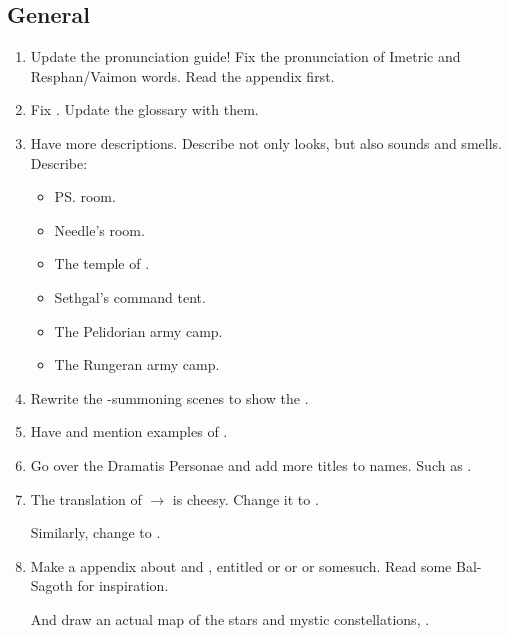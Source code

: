 \subsection{General}
\begin{enumerate}
  \item 
    Update the pronunciation guide!
    Fix the pronunciation of Imetric and Resphan/Vaimon words. 
    Read the  appendix first. 
    
  \item 
    Fix . 
    Update the glossary with them. 

  \item 
    Have more descriptions. 
    Describe not only looks, but also sounds and smells. 
    Describe: 
    \begin{itemize}
      \item \ps{\Tiroco} room. 
      \item Needle's room. 
      \item The temple of \EreshKal. 
      \item Sethgal's command tent. 
      \item The Pelidorian army camp. 
      \item The Rungeran army camp. 
    \end{itemize}
  
  \item 
    Rewrite the \Archon-summoning scenes to show the . 
  
  \item 
    Have and mention examples of . 
  
  \item 
    Go over the Dramatis Personae and add more titles to names. 
    Such as . 
  
  \item 
    The translation of  $\to$  is cheesy. 
    Change it to . 
    
    Similarly, change \itzach to .
  
  \item 
    Make a appendix about \matrices{} and , entitled  or  or  or somesuch. 
    Read some Bal-Sagoth for inspiration. 
    
    And draw an actual map of the stars and mystic constellations, . 
    

\end{enumerate}
